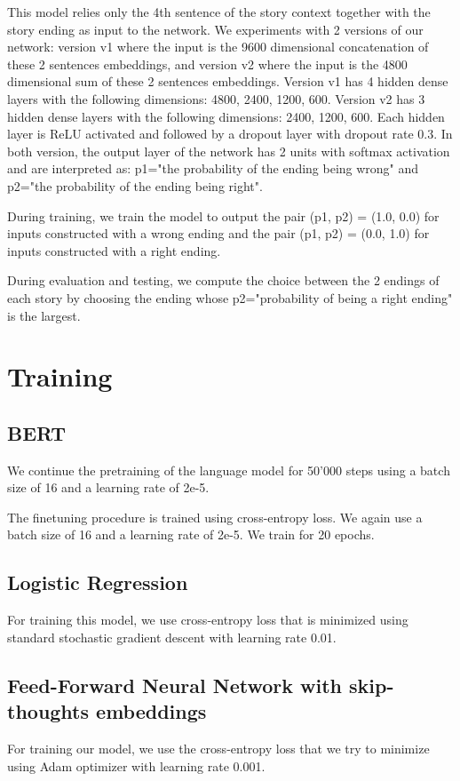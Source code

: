 \documentclass{article}
\begin{document}
This model relies only the 4th sentence of the story context together with the story ending as input to the network. We experiments with 2 versions of our network: version v1 where the input is the 9600 dimensional concatenation of these 2 sentences embeddings, and version v2 where the input is the 4800 dimensional sum of these 2 sentences embeddings. Version v1 has 4 hidden dense layers with the following dimensions: 4800, 2400, 1200, 600. Version v2 has 3 hidden dense layers with the following dimensions: 2400, 1200, 600. Each hidden layer is ReLU activated and followed by a dropout layer with dropout rate 0.3. In both version, the output layer of the network has 2 units with softmax activation and are interpreted as: p1="the probability of the ending being wrong" and p2="the probability of the ending being right".

During training, we train the model to output the pair (p1, p2) = (1.0, 0.0) for inputs constructed with a wrong ending and the pair (p1, p2) = (0.0, 1.0) for inputs constructed with a right ending.

During evaluation and testing, we compute the choice between the 2 endings of each story by choosing the ending whose p2="probability of being a right ending" is the largest.

\section{Training}
\subsection{BERT}
We continue the pretraining of the language model for 50'000 steps using a batch size of 16 and a learning rate of 2e-5.

The finetuning procedure is trained using cross-entropy loss. We again use a batch size of 16 and a learning rate of 2e-5. We train for 20 epochs.
\subsection{Logistic Regression}
For training this model, we use cross-entropy loss that is minimized using standard stochastic gradient descent with learning rate 0.01.
\subsection{Feed-Forward Neural Network with skip-thoughts embeddings}
For training our model, we use the cross-entropy loss that we try to minimize using Adam optimizer with learning rate 0.001.
\end{document}
